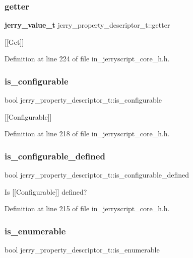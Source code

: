 \subsubsection{getter}
{\footnotesize\ttfamily \textbf{ jerry\+\_\+value\+\_\+t} jerry\+\_\+property\+\_\+descriptor\+\_\+t\+::getter}

[[Get]] 

Definition at line 224 of file in\+\_\+jerryscript\+\_\+core\+\_\+h.\+h.

\mbox{\label{structjerry__property__descriptor__t_abc0ddb22c307eaf90fe66222d26a3e30}} 
\subsubsection{is\_configurable}
{\footnotesize\ttfamily bool jerry\+\_\+property\+\_\+descriptor\+\_\+t\+::is\+\_\+configurable}

[[Configurable]] 

Definition at line 218 of file in\+\_\+jerryscript\+\_\+core\+\_\+h.\+h.

\mbox{\label{structjerry__property__descriptor__t_a8bb3feea246f850758861adab77aad3f}} 
\subsubsection{is\_configurable\_defined}
{\footnotesize\ttfamily bool jerry\+\_\+property\+\_\+descriptor\+\_\+t\+::is\+\_\+configurable\+\_\+defined}

Is [[Configurable]] defined? 

Definition at line 215 of file in\+\_\+jerryscript\+\_\+core\+\_\+h.\+h.

\mbox{\label{structjerry__property__descriptor__t_ae9e7b2ebca9fdf709b5808937c1e7999}} 
\subsubsection{is\_enumerable}
{\footnotesize\ttfamily bool jerry\+\_\+property\+\_\+descriptor\+\_\+t\+::is\+\_\+enumerable}

